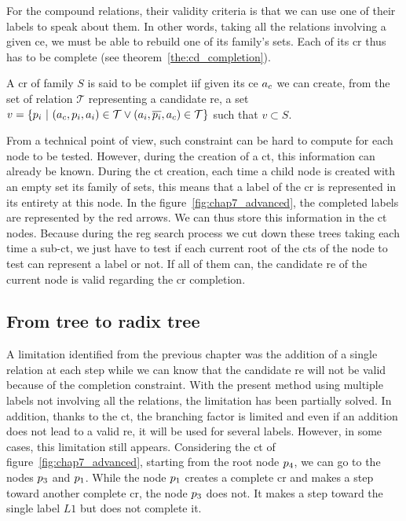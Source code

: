 For the compound relations, their validity criteria is that we can use one of their labels to speak about them. In other words, taking all the relations involving a given \acrshort{ce}, we must be able to rebuild one of its family's sets. Each of its \acrshort{cr} thus has to be complete (see theorem~\ref{the:cd_completion}).

\begin{theorem} 
\label{the:cd_completion}
A \acrshort{cr} of family $S$ is said to be complet iif given its \acrshort{ce} $a_c$ we can create, from the set of relation $\mathcal{T}$ representing a candidate \acrshort{re}, a set $v = \{p_i\ |\ (a_c, p_i, a_i) \in \mathcal{T} \lor (a_i, \overline{p_i}, a_c) \in \mathcal{T} \}$ such that $v \subset S$.
\end{theorem}

From a technical point of view, such constraint can be hard to compute for each node to be tested. However, during the creation of a \acrshort{ct}, this information can already be known. During the \acrshort{ct} creation, each time a child node is created with an empty set its family of sets, this means that a label of the \acrshort{cr} is represented in its entirety at this node. In the figure~\ref{fig:chap7_advanced}, the completed labels are represented by the red arrows. We can thus store this information in the \acrshort{ct} nodes. Because during the \acrshort{reg} search process we cut down these trees taking each time a sub-\acrshort{ct}, we just have to test if each current root of the \acrshort{ct}s of the node to test can represent a label or not. If all of them can, the candidate \acrshort{re} of the current node is valid regarding the \acrshort{cr} completion.

\subsection{From tree to radix tree}

A limitation identified from the previous chapter was the addition of a single relation at each step while we can know that the candidate \acrshort{re} will not be valid because of the completion constraint. With the present method using multiple labels not involving all the relations, the limitation has been partially solved. In addition, thanks to the \acrshort{ct}, the branching factor is limited and even if an addition does not lead to a valid \acrshort{re}, it will be used for several labels. However, in some cases, this limitation still appears. Considering the \acrlong{ct} of figure~\ref{fig:chap7_advanced}, starting from the root node $p_4$, we can go to the nodes $p_3$ and $p_1$. While the node $p_1$ creates a complete \acrshort{cr} and makes a step toward another complete \acrshort{cr}, the node $p_3$ does not. It makes a step toward the single label $L1$ but does not complete it.

